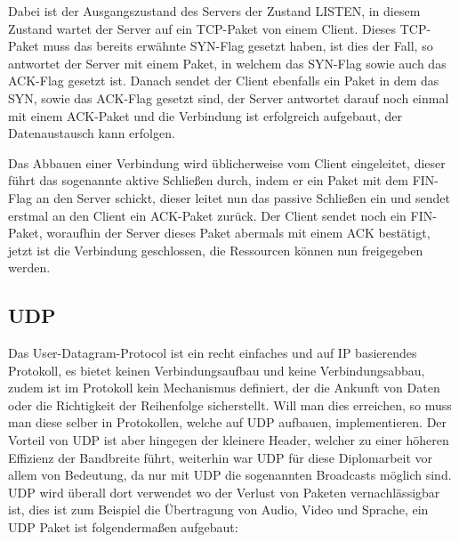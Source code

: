 \documentclass[a4paper,14pt,headsepline]{scrartcl}
\begin{document}
Dabei ist der Ausgangszustand des Servers der Zustand LISTEN, in diesem Zustand wartet der Server auf ein TCP-Paket von einem Client. Dieses TCP-Paket muss das bereits erwähnte SYN-Flag gesetzt haben, ist dies der Fall, so antwortet der Server mit einem Paket, in welchem das SYN-Flag sowie auch das ACK-Flag gesetzt ist. Danach sendet der Client ebenfalls ein Paket in dem das SYN, sowie das ACK-Flag gesetzt sind, der Server antwortet darauf noch einmal mit einem ACK-Paket und die Verbindung ist erfolgreich aufgebaut, der Datenaustausch kann erfolgen.

Das Abbauen einer Verbindung wird üblicherweise vom Client eingeleitet, dieser führt das sogenannte aktive Schließen durch, indem er ein Paket mit dem FIN-Flag an den Server schickt, dieser leitet nun das passive Schließen ein und sendet erstmal an den Client ein ACK-Paket zurück. Der Client sendet noch ein FIN-Paket, woraufhin der Server dieses Paket abermals mit einem ACK bestätigt, jetzt ist die Verbindung geschlossen, die Ressourcen können nun freigegeben werden.

\newpage
\subsection{UDP}
Das User-Datagram-Protocol ist ein recht einfaches und auf IP basierendes Protokoll, es bietet keinen Verbindungsaufbau und keine Verbindungsabbau, zudem ist im Protokoll kein Mechanismus definiert, der die Ankunft von Daten oder die Richtigkeit der Reihenfolge sicherstellt. Will man dies erreichen, so muss man diese selber in Protokollen, welche auf UDP aufbauen, implementieren. Der Vorteil von UDP ist aber hingegen der kleinere Header, welcher zu einer höheren Effizienz der Bandbreite führt, weiterhin war UDP für diese Diplomarbeit vor allem von Bedeutung, da nur mit UDP die sogenannten Broadcasts möglich sind. UDP wird überall dort verwendet wo der Verlust von Paketen vernachlässigbar ist, dies ist zum Beispiel die Übertragung von Audio, Video und Sprache, ein UDP Paket ist folgendermaßen aufgebaut:
\begin{figure}[h]
\begin{center}
\end{center}
\end{figure}
\end{document}
